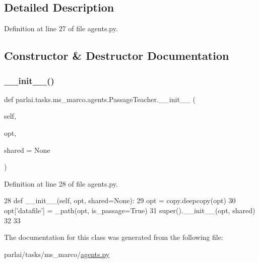 \subsection{Detailed Description}


Definition at line 27 of file agents.\+py.



\subsection{Constructor \& Destructor Documentation}
\mbox{\label{classparlai_1_1tasks_1_1ms__marco_1_1agents_1_1PassageTeacher_a94976bd31fa3b9da0ea1c7625b22c382}} 
\subsubsection{\texorpdfstring{\+\_\+\+\_\+init\+\_\+\+\_\+()}{\_\_init\_\_()}}
{\footnotesize\ttfamily def parlai.\+tasks.\+ms\+\_\+marco.\+agents.\+Passage\+Teacher.\+\_\+\+\_\+init\+\_\+\+\_\+ (\begin{DoxyParamCaption}\item[{}]{self,  }\item[{}]{opt,  }\item[{}]{shared = {\ttfamily None} }\end{DoxyParamCaption})}



Definition at line 28 of file agents.\+py.


\begin{DoxyCode}
28     \textcolor{keyword}{def }\_\_init\_\_(self, opt, shared=None):
29         opt = copy.deepcopy(opt)
30         opt[\textcolor{stringliteral}{'datafile'}] = \_path(opt, is\_passage=\textcolor{keyword}{True})
31         super().\_\_init\_\_(opt, shared)
32 
33 
\end{DoxyCode}


The documentation for this class was generated from the following file\+:\begin{DoxyCompactItemize}
\item 
parlai/tasks/ms\+\_\+marco/\hyperlink{parlai_2tasks_2ms__marco_2agents_8py}{agents.\+py}\end{DoxyCompactItemize}

